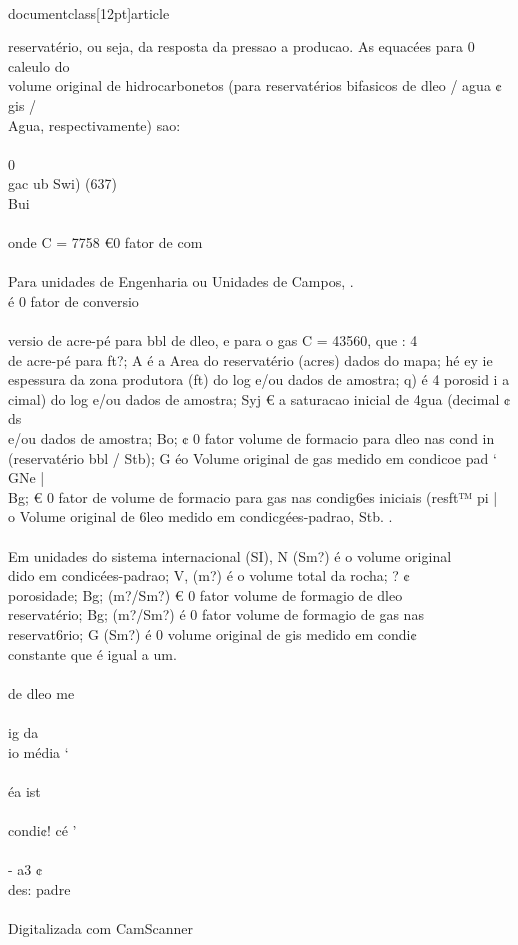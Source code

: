 \\documentclass[12pt]{article}
\begin{document}
reservatério, ou seja, da resposta da pressao a producao. As equacées para 0 caleulo do\\
volume original de hidrocarbonetos (para reservatérios bifasicos de dleo / agua ¢ gis /\\
Agua, respectivamente) sao:\\
\\
0\\
gac ub Swi) (637)\\
Bui\\
\\
onde C = 7758 €0 fator de com\\
\\
Para unidades de Engenharia ou Unidades de Campos, .\\
é 0 fator de conversio\\
\\
versio de acre-pé para bbl de dleo, e para o gas C = 43560, que : 4\\
de acre-pé para ft?; A é a Area do reservatério (acres) dados do mapa; hé ey ie\\
espessura da zona produtora (ft) do log e/ou dados de amostra; q) é 4 porosid i a\\
cimal) do log e/ou dados de amostra; Syj € a saturacao inicial de 4gua (decimal ¢ ds\\
e/ou dados de amostra; Bo; ¢ 0 fator volume de formacio para dleo nas cond in\\
(reservatério bbl / Stb); G éo Volume original de gas medido em condicoe pad ‘ GNe |\\
Bg; € 0 fator de volume de formacio para gas nas condig6es iniciais (resft™ pi |\\
o Volume original de 6leo medido em condicgées-padrao, Stb. .\\
\\
Em unidades do sistema internacional (SI), N (Sm?) é o volume original\\
dido em condicées-padrao; V, (m?) é o volume total da rocha; ? ¢\\
porosidade; Bg; (m?/Sm?) € 0 fator volume de formagio de dleo\\
reservatério; Bg; (m?/Sm?) é 0 fator volume de formagio de gas nas\\
reservat6rio; G (Sm?) é 0 volume original de gis medido em condi¢\\
constante que é igual a um.\\
\\
de dleo me\\
\\
ig da\\
io média ‘\\
\\
éa ist\\
\\
condi¢! cé ’\\
\\
- a3 ¢\\
des: padre\\
\\
Digitalizada com CamScanner\\
\end{document}
